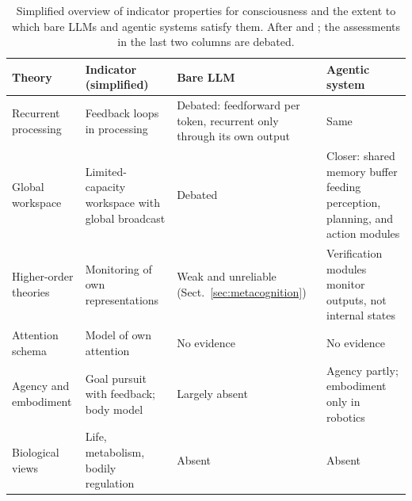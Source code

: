 \begin{table}
\tiny
\begin{tabularx}{\textwidth}{@{}p{2.6cm}p{3.4cm}XX@{}}
\toprule
\textbf{Theory} & \textbf{Indicator (simplified)} & \textbf{Bare LLM} & \textbf{Agentic system} \\
\midrule
Recurrent processing & Feedback loops in processing & Debated: feedforward per token, recurrent only through its own output & Same \\
Global workspace & Limited-capacity workspace with global broadcast & Debated & Closer: shared memory buffer feeding perception, planning, and action modules \\
Higher-order theories & Monitoring of own representations & Weak and unreliable (Sect.~\ref{sec:metacognition}) & Verification modules monitor outputs, not internal states \\
Attention schema & Model of own attention & No evidence & No evidence \\
Agency and embodiment & Goal pursuit with feedback; body model & Largely absent & Agency partly; embodiment only in robotics \\
Biological views & Life, metabolism, bodily regulation & Absent & Absent \\
\bottomrule
\end{tabularx}
\caption{Simplified overview of indicator properties for consciousness and the extent to which bare LLMs and agentic systems satisfy them. After \citet{butlin2023consciousness} and \citet{goldstein2024case}; the assessments in the last two columns are debated.}\label{tab:indicators}
\end{table}

